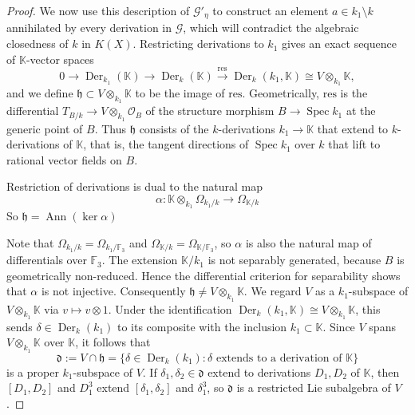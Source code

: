 \documentclass[10pt,abstract=true]{scrartcl}
\numberwithin{equation}{section}
\theoremstyle{definition}
\theoremstyle{remark}
\begin{document}
\begin{proof}
  \smallskip
  We now use this description of $\mathscr G'_\eta$ to construct an element $a\in k_1\setminus k$ annihilated by every derivation in $\mathscr G$, which will contradict the algebraic closedness of $k$ in $K(X)$.
  Restricting derivations to $k_1$ gives an exact sequence of $\mathbb K$-vector spaces
  \[
    0\longrightarrow\operatorname{Der}_{k_1}(\mathbb K)
    \longrightarrow\operatorname{Der}_k(\mathbb K)
    \xrightarrow{\mathrm{res}}\operatorname{Der}_k(k_1,\mathbb K) \cong V \otimes_{k_1}\mathbb K,
  \]
  and we define $\mathfrak h\subset V\otimes_{k_1}\mathbb K$ to be the image of $\mathrm{res}$.
  Geometrically, $\mathrm{res}$ is the differential $T_{B/k}\to V\otimes_{k_1}\mathcal O_B$ of the structure morphism $B\to\operatorname{Spec}k_1$ at the generic point of $B$.
  Thus $\mathfrak h$ consists of the $k$-derivations $k_1\to\mathbb K$ that extend to $k$-derivations of $\mathbb K$, that is, the tangent directions of $\operatorname{Spec}k_1$ over $k$ that lift to rational vector fields on $B$.

  Restriction of derivations is dual to the natural map \[
    \alpha\colon\mathbb K\otimes_{k_1}\Omega_{k_1/k}\to\Omega_{\mathbb K/k}
  \]
  So $\mathfrak h = \operatorname{Ann}(\ker \alpha)$

  Note that $\Omega_{k_1/k}=\Omega_{k_1/\mathbb F_3}$ and $\Omega_{\mathbb K/k}=\Omega_{\mathbb K/\mathbb F_3}$, so $\alpha$ is also the natural map of differentials over $\mathbb F_3$.
  The extension $\mathbb K/k_1$ is not separably generated, because $B$ is geometrically non-reduced.
  Hence the differential criterion for separability \cite[Tag~\href{https://stacks.math.columbia.edu/tag/031X}{031X}]{StacksProject} shows that $\alpha$ is not injective.
  Consequently $\mathfrak h\ne V\otimes_{k_1}\mathbb K$.
  We regard $V$ as a $k_1$-subspace of $V\otimes_{k_1}\mathbb K$ via $v\mapsto v\otimes1$.
  Under the identification $\operatorname{Der}_k(k_1,\mathbb K)\cong V\otimes_{k_1}\mathbb K$, this sends $\delta\in\operatorname{Der}_k(k_1)$ to its composite with the inclusion $k_1\subset\mathbb K$.
  Since $V$ spans $V\otimes_{k_1}\mathbb K$ over $\mathbb K$, it follows that
  \[
    \mathfrak d:=V\cap\mathfrak h
      =\{\delta\in\operatorname{Der}_k(k_1):\delta\text{ extends to a derivation of }\mathbb K\}
  \]
  is a proper $k_1$-subspace of $V$.
  If $\delta_1,\delta_2\in\mathfrak d$ extend to derivations $D_1,D_2$ of $\mathbb K$, then $[D_1,D_2]$ and $D_1^3$ extend $[\delta_1,\delta_2]$ and $\delta_1^3$, so $\mathfrak d$ is a restricted Lie subalgebra of $V$.


\end{proof}
\end{document}
